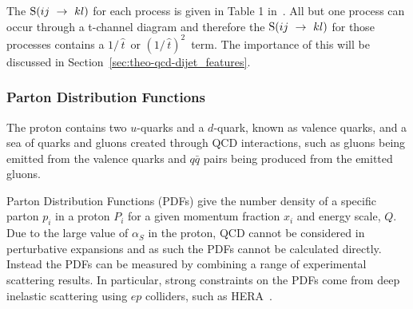 The $\text{S}\nobreak(ij~\to~kl)$ for each process is given in Table 1 in~\cite{theo-dijet_harris}.
All but one process can occur through a t-channel diagram and therefore the 
$\text{S}\nobreak(ij~\to~kl)$ for those processes contains a $1/\,\hat{t}\,$ or $(1/\,\hat{t})^2\,$ term.
The importance of this will be discussed in Section~\ref{sec:theo-qcd-dijet_features}.


\subsubsection{Parton Distribution Functions}
\label{sec:theo-qcd_pdf}

The proton contains two $u$-quarks and a $d$-quark, known as valence quarks, and a sea of quarks and gluons created
through QCD interactions, such as gluons being emitted from the valence quarks and $q\bar{q}$ pairs being produced from the emitted gluons.

Parton Distribution Functions (PDFs) give the number density of a specific parton $p_i$ in a proton $P_i$
for a given momentum fraction $x_i$ and energy scale, $Q$.
Due to the large value of $\alpha_S$ in the proton, QCD cannot be considered in perturbative expansions and as such the PDFs cannot be calculated directly.
Instead the PDFs can be measured by combining a range of experimental scattering results.
In particular, strong constraints on the PDFs come from deep inelastic scattering using $ep$ colliders, such as HERA~\cite{theo-qcd_hera}.

